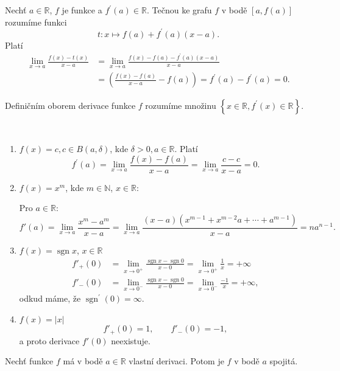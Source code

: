 \begin{poznamka}
	Nechť $a\in \mathbb R $, $f$ je funkce a $f^\prime(a)\in \mathbb R $. Tečnou ke grafu $f$ v bodě
	$\left [ a,f(a) \right ] $ rozumíme funkci
	$$
	   t: x\mapsto f(a)+ f^\prime(a)(x-a).
	$$
	Platí
	\begin{align*}
	\lim_{x\to a} \frac{f(x)-t(x)}{x-a}&= \lim_{x\to a} \frac{f(x)-f(a)-f^\prime(a)(x-a)}{x-a}\\
	&= \left( \frac{f(x)-f(a)}{x-a}-f(a) \right )= f^\prime(a)-f^\prime(a) = 0.
	\end{align*}
\end{poznamka}

\begin{poznamka}
	Definičním oborem derivace funkce $f$ rozumíme množinu
	$\left \{ x \in \mathbb R , f^\prime (x)\in \mathbb R  \right \} $.
\end{poznamka}

\begin{priklad}\,
\begin{enumerate}[$i.$]
	\item $f(x)=c, c\in B(a, \delta)$, kde $\delta>0, a \in \mathbb R $. Platí
	$$
	    f^\prime(a) = \lim_{x\to a} \frac{f(x)-f(a)}{x-a} = \lim_{x\to a} \frac{c-c}{x-a} = 0.
	$$
	\item $f(x)=x^m$, kde $m\in\mathbb{N}$, $x\in\mathbb{R}$:
	\par  Pro $a\in\mathbb{R}$:
    \[
    f'(a)=\lim_{x\to a}\frac{x^m-a^m}{x-a}=\lim_{x\to a}\frac{(x-a)\left(x^{m-1}+x^{m-2}a+\cdots+a^{m-1}\right)}{x-a}=na^{n-1}.
    \]
    \item $f(x)=\operatorname{sgn}x$, $x\in\mathbb{R}$
    \begin{align*}
    f'_+(0)&=\lim_{x\to0^+}\frac{\operatorname{sgn}x-\operatorname{sgn}0}{x-0}
    =\lim_{x\to0^+}\frac{1}{x}=+\infty\\
    f'_-(0)&=\lim_{x\to0^-}\frac{\operatorname{sgn}x-\operatorname{sgn}0}{x-0}
    =\lim_{x\to0^-}\frac{-1}{x}=+\infty,
    \end{align*}
    odkud máme, že $\operatorname{sgn}^\prime(0)=\infty.$
    \item $f(x)=|x|$
    \[
    f'_+(0)=1, \qquad f'_-(0)=-1,
    \]
    a proto derivace $f'(0)$ neexistuje.
\end{enumerate}
\end{priklad}

\begin{veta}\label{veta5.1}
	Nechť funkce $f$ má v bodě $a \in \mathbb R $ vlastní derivaci. Potom je $f$ v bodě $a$ spojitá.
\end{veta}

